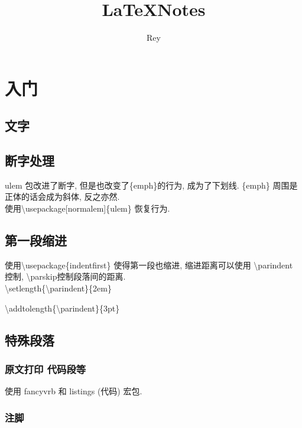 \documentclass[11pt]{article}
\title{\LaTeX Notes}
\author{Rey}
\begin{document}
\maketitle

\tableofcontents


\section{入门}

\subsection{文字}
\subsection{断字处理}
ulem 包改进了断字, 但是也改变了\{emph\}的行为, 成为了下划线. \{emph\} 周围是正体的话会成为斜体, 反之亦然.\\

使用\textbackslash{usepackage}[normalem]\{ulem\} 恢复行为.\\

\subsection{第一段缩进}
使用\textbackslash{usepackage}\{indentfirst\} 使得第一段也缩进, 缩进距离可以使用 \textbackslash{parindent} 控制, \textbackslash{parskip}控制段落间的距离.\\

\textbackslash{setlength}\{\textbackslash{parindent}\}\{2em\}

\textbackslash{addtolength}\{\textbackslash{parindent}\}\{3pt\}\\

\subsection{特殊段落}

\subsubsection{原文打印 代码段等}

使用 fancyvrb 和 listings (代码) 宏包.

\subsubsection{注脚}
\end{document}
